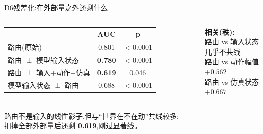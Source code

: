 \documentclass[aspectratio=169,10pt]{beamer}
\newcommand{\hi}[1]{{\color{teal}\bfseries #1}}
\newcommand{\dimm}[1]{{\footnotesize\color{gray2}#1}}
\begin{document}
\begin{frame}{D6\quad 残差化:在外部量之外还剩什么}
  \small
  \begin{columns}[T]
      \begin{tabular}{@{}lcc@{}}
        \toprule
        & \textbf{AUC} & \textbf{p} \\ \midrule
        路由(原始) & 0.801 & $<$0.0001 \\
        路由 $\perp$ 模型输入状态 & \hi{0.780} & $<$0.0001 \\
        路由 $\perp$ 输入+动作+仿真 & \hi{0.619} & 0.046 \\
        模型输入状态 $\perp$ 路由 & 0.688 & $<$0.0001 \\ \bottomrule
      \end{tabular}
      \textbf{相关(秩):}\\[3pt]
      路由 vs 输入状态\quad \hi{$+0.208$}\\
      \dimm{几乎不共线}\\[3pt]
      路由 vs 动作幅值\quad $+0.562$\\
      路由 vs 仿真状态\quad $+0.667$
  \end{columns}
  \vfill
  \begin{center}\small
  路由不是输入的线性影子,但与“世界在不在动”共线较多;\\
  扣掉全部外部量后还剩 \hi{0.619},刚过显著线。
  \end{center}
\end{frame}
\end{document}
